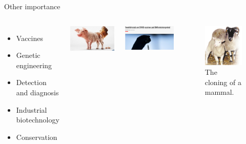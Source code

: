 \documentclass[11pt,ignorenonframetext,aspectratio=169]{beamer}
\providecommand{\tightlist}{%
  \setlength{\itemsep}{0pt}\setlength{\parskip}{0pt}}
\newcommand{\bcolumns}{\begin{columns}[T, onlytextwidth]}
\newcommand{\ecolumns}{\end{columns}}
\begin{document}
\begin{frame}{Other importance}
\protect\hypertarget{other-importance}{}
\bcolumns
{}

\begin{itemize}[<+->]
\tightlist
\item
  Vaccines
\item
  Genetic engineering
\item
  Detection and diagnosis
\item
  Industrial biotechnology
\item
  Conservation
\end{itemize}

\begin{center}\includegraphics[width=0.6\linewidth]{../images/genetic_engineering_meme} \end{center}


\begin{center}\includegraphics[width=0.65\linewidth]{../images/covid_vaccine_changes_human_DNA} \end{center}

\begin{figure}

{\centering \includegraphics[width=0.48\linewidth]{../images/dolly} 

}

\caption{The cloning of a mammal.}\label{fig:dolly}
\end{figure}

\ecolumns
\end{frame}
\end{document}
